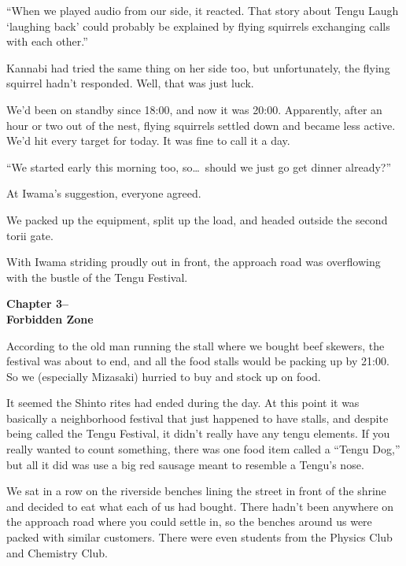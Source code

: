 \documentclass[
    a4paper,
    12pt,
    twoside,
    openany,
    UTF8,
    fontset=windows
]{ctexbook}
\begin{document}
``When we played audio from our side, it reacted. That story about Tengu Laugh `laughing back' could probably be explained by flying squirrels exchanging calls with each other.''

Kannabi had tried the same thing on her side too, but unfortunately, the flying squirrel hadn't responded. Well, that was just luck.

We'd been on standby since 18:00, and now it was 20:00. Apparently, after an hour or two out of the nest, flying squirrels settled down and became less active. We'd hit every target for today. It was fine to call it a day.

``We started early this morning too, so\dots\ should we just go get dinner already?''

At Iwama's suggestion, everyone agreed.

We packed up the equipment, split up the load, and headed outside the second torii gate.

With Iwama striding proudly out in front, the approach road was overflowing with the bustle of the Tengu Festival.

\clearpage
\thispagestyle{plain}
\begin{center}
    \large\bfseries
    Chapter 3–\\
    Forbidden Zone
\end{center}
\label{sec:ch3m}
\vspace{1cm}

According to the old man running the stall where we bought beef skewers, the festival was about to end, and all the food stalls would be packing up by 21:00. So we (especially Mizasaki) hurried to buy and stock up on food.

It seemed the Shinto rites had ended during the day. At this point it was basically a neighborhood festival that just happened to have stalls, and despite being called the Tengu Festival, it didn't really have any tengu elements. If you really wanted to count something, there was one food item called a ``Tengu Dog,'' but all it did was use a big red sausage meant to resemble a Tengu's nose.

We sat in a row on the riverside benches lining the street in front of the shrine and decided to eat what each of us had bought. There hadn't been anywhere on the approach road where you could settle in, so the benches around us were packed with similar customers. There were even students from the Physics Club and Chemistry Club.
\end{document}
